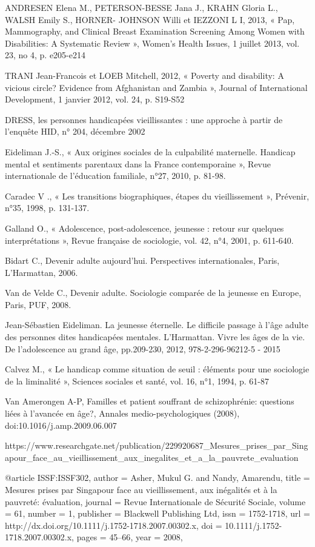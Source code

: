 ANDRESEN Elena M., PETERSON-BESSE Jana J., KRAHN Gloria L., WALSH Emily S., HORNER- JOHNSON Willi et IEZZONI L I, 2013, « Pap, Mammography, and Clinical Breast Examination Screening Among Women with Disabilities: A Systematic Review », Women’s Health Issues, 1 juillet 2013, vol. 23, no 4, p. e205-e214

TRANI Jean-Francois et LOEB Mitchell, 2012, « Poverty and disability: A vicious circle? Evidence from Afghanistan and Zambia », Journal of International Development, 1 janvier 2012, vol. 24, p. S19-S52

DRESS, les personnes handicapées vieillissantes : une approche à partir de l’enquête HID, n° 204, décembre 2002


Eideliman J.-S., « Aux origines sociales de la culpabilité maternelle. Handicap mental et sentiments parentaux dans la France contemporaine », Revue internationale de l’éducation familiale, n°27, 2010, p. 81-98. 


Caradec V ., « Les transitions biographiques, étapes du vieillissement », Prévenir, n°35, 1998, p. 131-137.

Galland O., « Adolescence, post-adolescence, jeunesse : retour sur quelques interprétations », Revue française de sociologie, vol. 42, n°4, 2001, p. 611-640.

Bidart C., Devenir adulte aujourd’hui. Perspectives internationales, Paris, L’Harmattan, 2006. 

Van de Velde C., Devenir adulte. Sociologie comparée de la jeunesse en Europe, Paris, PUF, 2008.


Jean-Sébastien Eideliman. La jeunesse éternelle. Le difficile passage à l’âge adulte des personnes dites handicapées mentales. L’Harmattan. Vivre les âges de la vie. De l’adolescence au grand âge, pp.209-230, 2012, 978-2-296-96212-5 - 2015

Calvez M., « Le handicap comme situation de seuil : éléments pour une sociologie de la liminalité », Sciences sociales et santé, vol. 16, n°1, 1994, p. 61-87

Van Amerongen A-P, Familles et patient souffrant de schizophrénie: questions liées à l’avancée en âge?, Annales medio-psychologiques (2008), doi:10.1016/j.amp.2009.06.007


https://www.researchgate.net/publication/229920687_Mesures_prises_par_Singapour_face_au_vieillissement_aux_inegalites_et_a_la_pauvrete_evaluation

@article {ISSF:ISSF302,
author = {Asher, Mukul G. and Nandy, Amarendu},
title = {Mesures prises par Singapour face au vieillissement, aux inégalités et à la pauvreté: évaluation},
journal = {Revue Internationale de Sécurité Sociale},
volume = {61},
number = {1},
publisher = {Blackwell Publishing Ltd},
issn = {1752-1718},
url = {http://dx.doi.org/10.1111/j.1752-1718.2007.00302.x},
doi = {10.1111/j.1752-1718.2007.00302.x},
pages = {45--66},
year = {2008},
}
